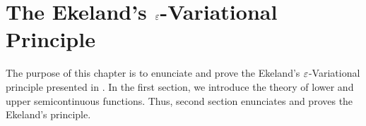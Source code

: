 %
\chapter{The Ekeland's $\varepsilon$-Variational Principle}

    The purpose of this chapter is to enunciate and prove the Ekeland's
    $\varepsilon$-Variational principle presented in {\cite{guler2010foundations}}. 
    In the first section, we introduce the theory of lower and upper
    semicontinuous functions.  Thus, second section enunciates and
    proves the Ekeland's principle. 
    
    
\newpage